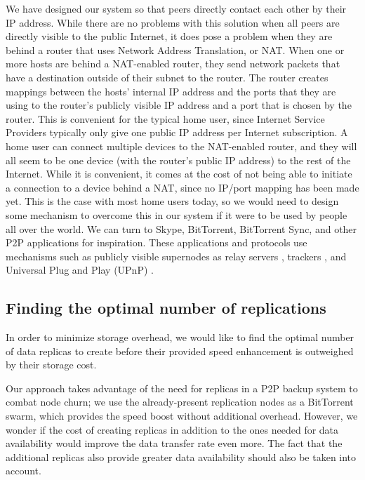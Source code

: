 \documentclass[12pt]{report}
\begin{document}
We have designed our system so that peers directly contact each other by their IP address. While there are no problems with this solution when all peers are directly visible to the public Internet, it does pose a problem when they are behind a router that uses Network Address Translation, or NAT. When one or more hosts are behind a NAT-enabled router, they send network packets that have a destination outside of their subnet to the router. The router creates mappings between the hosts' internal IP address and the ports that they are using to the router's publicly visible IP address and a port that is chosen by the router. This is convenient for the typical home user, since Internet Service Providers typically only give one public IP address per Internet subscription. A home user can connect multiple devices to the NAT-enabled router, and they will all seem to be one device (with the router's public IP address) to the rest of the Internet. While it is convenient, it comes at the cost of not being able to initiate a connection to a device behind a NAT, since no IP/port mapping has been made yet. This is the case with most home users today, so we would need to design some mechanism to overcome this in our system if it were to be used by people all over the world. We can turn to Skype, BitTorrent, BitTorrent Sync, and other P2P applications for inspiration. These applications and protocols use mechanisms such as publicly visible supernodes as relay servers \cite{skypeSupernode}, trackers \cite{bittorrentProtocol}, and Universal Plug and Play (UPnP) \cite{btsynctech}.

\subsection{Finding the optimal number of replications}

In order to minimize storage overhead, we would like to find the optimal number of data replicas to create before their provided speed enhancement is outweighed by their storage cost.

Our approach takes advantage of the need for replicas in a P2P backup system to combat node churn; we use the already-present replication nodes as a BitTorrent swarm, which provides the speed boost without additional overhead. However, we wonder if the cost of creating replicas in addition to the ones needed for data availability would improve the data transfer rate even more. The fact that the additional replicas also provide greater data availability should also be taken into account.
\end{document}
